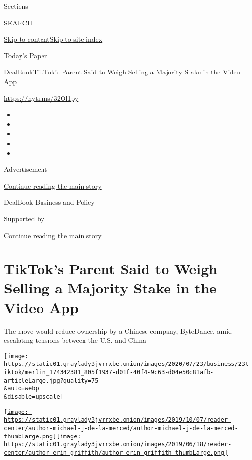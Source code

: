 Sections

SEARCH

\protect\hyperlink{site-content}{Skip to
content}\protect\hyperlink{site-index}{Skip to site index}

\href{https://myaccount.nytimes3xbfgragh.onion/auth/login?response_type=cookie\&client_id=vi}{}

\href{https://www.nytimes3xbfgragh.onion/section/todayspaper}{Today's
Paper}

\href{/section/business/dealbook}{DealBook}\textbar{}TikTok's Parent
Said to Weigh Selling a Majority Stake in the Video App

\url{https://nyti.ms/32Ol1py}

\begin{itemize}
\item
\item
\item
\item
\item
\end{itemize}

Advertisement

\protect\hyperlink{after-top}{Continue reading the main story}

DealBook Business and Policy

Supported by

\protect\hyperlink{after-sponsor}{Continue reading the main story}

\hypertarget{tiktoks-parent-said-to-weigh-selling-a-majority-stake-in-the-video-app}{%
\section{TikTok's Parent Said to Weigh Selling a Majority Stake in the
Video
App}\label{tiktoks-parent-said-to-weigh-selling-a-majority-stake-in-the-video-app}}

The move would reduce ownership by a Chinese company, ByteDance, amid
escalating tensions between the U.S. and China.

\texttt{[image: https://static01.graylady3jvrrxbe.onion/images/2020/07/23/business/23tiktok/merlin\_174342381\_805f1937-d01f-40f4-9c63-d04e50c81afb-articleLarge.jpg?quality=75\\\&auto=webp\\\&disable=upscale]}

\href{https://www.nytimes3xbfgragh.onion/by/michael-j-de-la-merced}{\texttt{[image: https://static01.graylady3jvrrxbe.onion/images/2019/10/07/reader-center/author-michael-j-de-la-merced/author-michael-j-de-la-merced-thumbLarge.png]}}\href{https://www.nytimes3xbfgragh.onion/by/erin-griffith}{\texttt{[image: https://static01.graylady3jvrrxbe.onion/images/2019/06/18/reader-center/author-erin-griffith/author-erin-griffith-thumbLarge.png]}}

